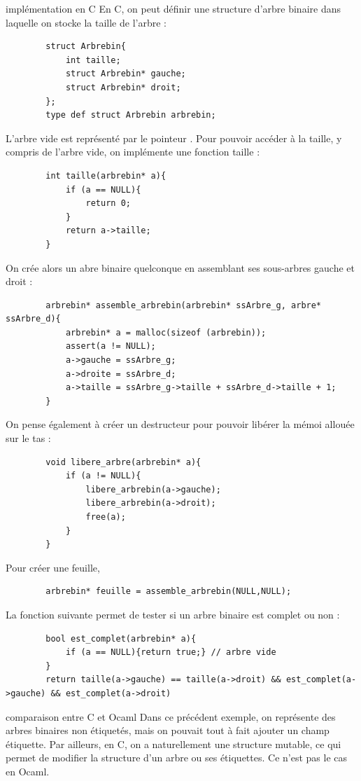 \begin{exemple}{7.11}{implémentation en C}
    En C, on peut définir une structure d'arbre binaire dans laquelle on stocke la taille de l'arbre :
    \begin{verbatim}
        struct Arbrebin{
            int taille;
            struct Arbrebin* gauche;
            struct Arbrebin* droit;
        };
        type def struct Arbrebin arbrebin;
    \end{verbatim}
    L'arbre vide est représenté par le pointeur . Pour pouvoir accéder à la taille, y compris de l'arbre vide, on implémente une fonction taille : 
    \begin{verbatim}
        int taille(arbrebin* a){
            if (a == NULL){
                return 0;
            }
            return a->taille;
        }
    \end{verbatim}
    On crée alors un abre binaire quelconque en assemblant ses sous-arbres gauche et droit : 
    \begin{verbatim}
        arbrebin* assemble_arbrebin(arbrebin* ssArbre_g, arbre* ssArbre_d){
            arbrebin* a = malloc(sizeof (arbrebin));
            assert(a != NULL);
            a->gauche = ssArbre_g;
            a->droite = ssArbre_d;
            a->taille = ssArbre_g->taille + ssArbre_d->taille + 1;
        }
    \end{verbatim}
    On pense également à créer un destructeur pour pouvoir libérer la mémoi allouée sur le tas : 
    \begin{verbatim}
        void libere_arbre(arbrebin* a){
            if (a != NULL){
                libere_arbrebin(a->gauche);
                libere_arbrebin(a->droit);
                free(a);
            }
        }
    \end{verbatim}
    Pour créer une feuille,
    \begin{verbatim}
        arbrebin* feuille = assemble_arbrebin(NULL,NULL);
    \end{verbatim}
    La fonction suivante permet de tester si un arbre binaire est complet ou non : 
    \begin{verbatim}
        bool est_complet(arbrebin* a){
            if (a == NULL){return true;} // arbre vide
        }
        return taille(a->gauche) == taille(a->droit) && est_complet(a->gauche) && est_complet(a->droit)
    \end{verbatim}
\end{exemple}

\begin{remarque}{7.12}{comparaison entre C et Ocaml}
    Dans ce précédent exemple, on représente des arbres binaires non étiquetés, mais on pouvait tout à fait ajouter un champ étiquette. Par ailleurs, en C, on a naturellement une structure mutable, ce qui permet de modifier la structure d'un arbre ou ses étiquettes. Ce n'est pas le cas en Ocaml.
\end{remarque}

